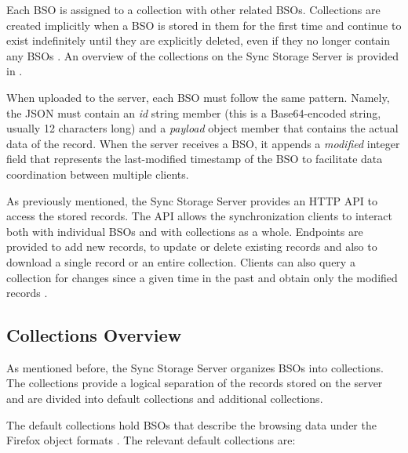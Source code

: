 Each BSO is assigned to a collection with other related BSOs. Collections are created implicitly when a BSO is stored in them for the first time and continue to exist indefinitely until they are explicitly deleted, even if they no longer contain any BSOs \cite{storage-server-docs}. An overview of the collections on the Sync Storage Server is provided in .

When uploaded to the server, each BSO must follow the same pattern. Namely, the JSON must contain an \textit{id} string member (this is a Base64-encoded string, usually 12 characters long) and a \textit{payload} object member that contains the actual data of the record. When the server receives a BSO, it appends a \textit{modified} integer field that represents the last-modified timestamp of the BSO to facilitate data coordination between multiple clients.

As previously mentioned, the Sync Storage Server provides an HTTP API to access the stored records. The API allows the synchronization clients to interact both with individual BSOs and with collections as a whole. Endpoints are provided to add new records, to update or delete existing records and also to download a single record or an entire collection. Clients can also query a collection for changes since a given time in the past and obtain only the modified records \cite{storage-server-docs}.

\subsection{Collections Overview}
\label{sub-sec:collections-overview}

As mentioned before, the Sync Storage Server organizes BSOs into collections. The collections provide a logical separation of the records stored on the server and are divided into default collections and additional collections.

The default collections hold BSOs that describe the browsing data under the Firefox object formats \cite{sync-client-docs}. The relevant default collections are:

